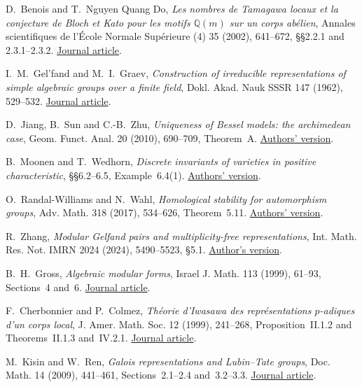 D.~Benois and T.~Nguyen Quang Do,
\emph{Les nombres de Tamagawa locaux et la conjecture de Bloch et Kato pour les motifs
\(\mathbb Q(m)\) sur un corps ab\'elien},
Annales scientifiques de l'\'Ecole Normale Sup\'erieure (4) 35 (2002), 641--672,
\S\S2.2.1 and 2.3.1--2.3.2.
\href{https://doi.org/10.1016/S0012-9593(02)01104-7}{Journal article}.

I.~M.~Gel'fand and M.~I.~Graev,
\emph{Construction of irreducible representations of simple algebraic groups over a finite field},
Dokl. Akad. Nauk SSSR 147 (1962), 529--532.
\href{https://www.mathnet.ru/eng/dan27244}{Journal article}.

D.~Jiang, B.~Sun and C.-B.~Zhu,
\emph{Uniqueness of Bessel models: the archimedean case},
Geom. Funct. Anal. 20 (2010), 690--709, Theorem~A.
\href{https://arxiv.org/abs/0908.1728}{Authors' version}.

B.~Moonen and T.~Wedhorn, \emph{Discrete invariants of varieties in positive characteristic},
\S\S6.2--6.5, Example~6.4(1).
\href{https://arxiv.org/abs/math/0306339}{Authors' version}.

O.~Randal-Williams and N.~Wahl, \emph{Homological stability for automorphism groups},
Adv. Math. 318 (2017), 534--626, Theorem~5.11.
\href{https://web.math.ku.dk/~wahl/Autstability.pdf}{Authors' version}.

R.~Zhang, \emph{Modular Gelfand pairs and multiplicity-free representations},
Int. Math. Res. Not. IMRN 2024 (2024), 5490--5523, \S5.1.
\href{https://arxiv.org/abs/2111.04058}{Author's version}.

B.~H.~Gross, \emph{Algebraic modular forms}, Israel J. Math. 113
(1999), 61--93, Sections~4 and~6.
\href{https://doi.org/10.1007/BF02780173}{Journal article}.

F.~Cherbonnier and P.~Colmez,
\emph{Th\'eorie d'Iwasawa des repr\'esentations \(p\)-adiques d'un corps local},
J. Amer. Math. Soc. 12 (1999), 241--268, Proposition~II.1.2 and
Theorems~II.1.3 and~IV.2.1.
\href{https://doi.org/10.1090/S0894-0347-99-00281-7}{Journal article}.

M.~Kisin and W.~Ren, \emph{Galois representations and Lubin--Tate groups},
Doc. Math. 14 (2009), 441--461, Sections~2.1--2.4 and~3.2--3.3.
\href{https://emis.de/ft/10201}{Journal article}.
